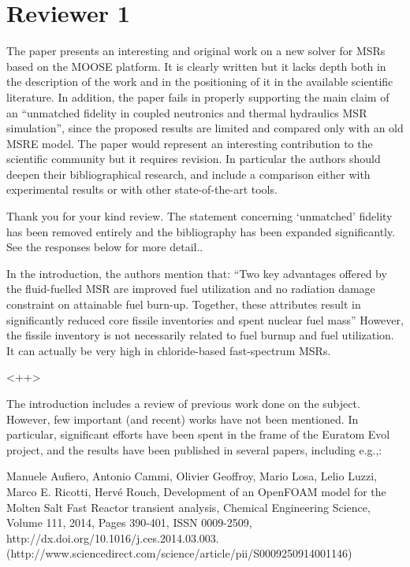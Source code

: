 \documentclass[answers,11pt]{exam}
\begin{document}
\section*{Reviewer 1}
\begin{questions}

\question The paper presents an interesting and original work on a new solver
for MSRs based on the MOOSE platform.  It is clearly written but it lacks depth
both in the description of the work and in the positioning of it in the
available scientific literature.  In addition, the paper fails in properly
supporting the main claim of an ``unmatched fidelity in coupled neutronics and
thermal hydraulics MSR simulation'', since the proposed results are limited and
compared only with an old MSRE model. The paper would represent an interesting
contribution to the scientific community but it requires revision. In
particular the authors should deepen their bibliographical research, and
include a comparison either with experimental results or with other
state-of-the-art tools.
\begin{solution}
        Thank you for your kind review.
        The statement concerning `unmatched' fidelity has been removed 
        entirely and the bibliography has been expanded significantly. See the 
        responses below for more detail..
\end{solution}


\question In the introduction, the authors mention that:
``Two key advantages offered by the fluid-fuelled MSR are improved fuel 
        utilization and no radiation damage constraint on attainable fuel 
        burn-up. Together, these attributes result in significantly reduced 
        core fissile inventories and spent nuclear fuel mass''
However, the fissile inventory is not necessarily related to fuel burnup and fuel utilization. It can actually be  very high in chloride-based fast-spectrum MSRs.
\begin{solution}
        <++>
\end{solution}

\question The introduction includes a review of previous work done on the subject. However, few important (and recent) works have not been mentioned. In particular, significant efforts have been spent in the frame of the Euratom Evol project, and the results have been published in several papers, including e.g.,:

Manuele Aufiero, Antonio Cammi, Olivier Geoffroy, Mario Losa, Lelio Luzzi, Marco E. Ricotti, Hervé Rouch, Development of an OpenFOAM model for the Molten Salt Fast Reactor transient analysis, Chemical Engineering Science, Volume 111, 2014, Pages 390-401, ISSN 0009-2509, http://dx.doi.org/10.1016/j.ces.2014.03.003.
(http://www.sciencedirect.com/science/article/pii/S0009250914001146)


\end{questions}
\end{document}

